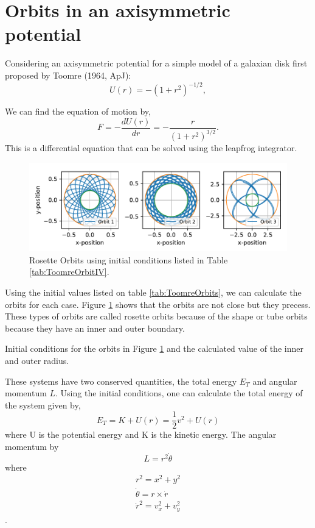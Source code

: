 \section{Orbits in an axisymmetric potential}
Considering an axisymmetric potential for a simple model of a galaxian disk first proposed by Toomre (1964, ApJ):
\begin{equation}
    U(r) = -(1+r^2)^{-1/2},
\end{equation}

We can find the equation of motion by,
\begin{equation}
    F=-\frac{dU(r)}{dr}=-\frac{r}{(1+r^2)^{3/2}}.
\end{equation}
This is a differential equation that can be solved using the leapfrog integrator.

\begin{figure}[h!]
    \centering
    \includegraphics{CodeAndFigures/ToomrePotentialOrbits.pdf}
    \caption{Rosette Orbits using initial conditions listed in Table \ref{tab:ToomreOrbitIV}.}
    \label{fig:ToomreOrbits}
\end{figure}

Using the initial values listed on table \ref{tab:ToomreOrbits}, we can calculate the orbits for each case. Figure \ref{fig:ToomreOrbits} shows that the orbits are not close but they precess. These types of orbits are called rosette orbits because of the shape or tube orbits because they have an inner and outer boundary.

\begin{table}[]
    \centering

    \caption{Initial conditions for the orbits in Figure \ref{fig:ToomreOrbits} and the calculated value of the inner and outer radius.}
    \label{tab:ToomreOrbitIV}
\end{table}

These systems have two conserved quantities, the total energy $E_T$ and angular momentum $L$. Using the initial conditions, one can calculate the total energy of the system given by,
\begin{equation}
    E_T=K + U(r) = \frac{1}{2}v^2 + U(r)
\end{equation}
where U is the potential energy and K is the kinetic energy.
The angular momentum by
\begin{equation}
    L=r^2\Dot{\theta}
\end{equation}
where 
\begin{align}
    r^2 = x^2 + y^2\\
    \Dot{\theta} = r \times \dot{r}\\
    \dot{r}^2 = v_x^2 + v_y^2
\end{align}.

